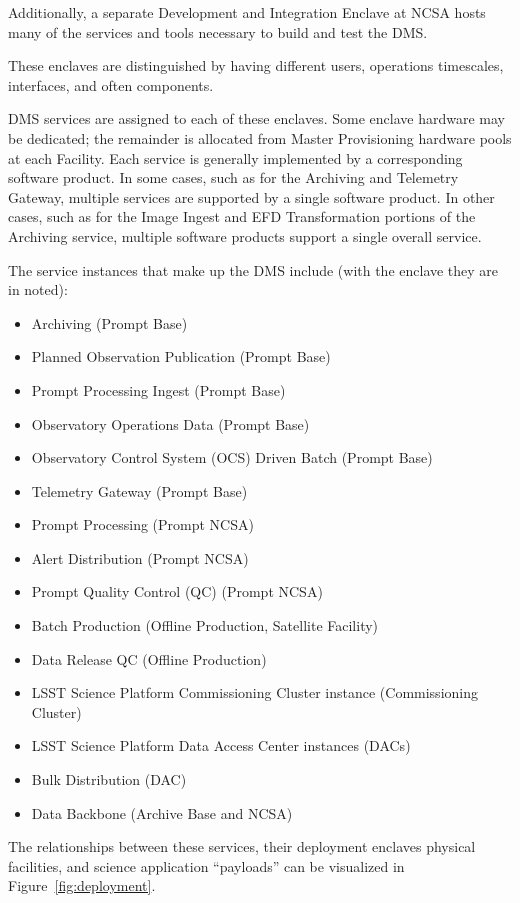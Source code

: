 \documentclass[DM,toc,lsstdraft]{lsstdoc}
\begin{document}
Additionally, a separate Development and Integration Enclave at NCSA hosts many of the services and tools necessary to build and test the DMS.

These enclaves are distinguished by having different users, operations timescales, interfaces, and often components.

DMS services are assigned to each of these enclaves.  Some enclave hardware may be dedicated; the remainder is allocated from Master Provisioning hardware pools at each Facility.
Each service is generally implemented by a corresponding software product.
In some cases, such as for the Archiving and Telemetry Gateway, multiple services are supported by a single software product.
In other cases, such as for the Image Ingest and EFD Transformation portions of the Archiving service, multiple software products support a single overall service.

The service instances that make up the DMS include (with the
enclave they are in noted):
\begin{itemize}
\item
  Archiving (Prompt Base)
\item
  Planned Observation Publication (Prompt Base)
\item
  Prompt Processing Ingest (Prompt Base)
\item
  Observatory Operations Data (Prompt Base)
\item
  Observatory Control System (OCS) Driven Batch (Prompt Base)
\item
  Telemetry Gateway (Prompt Base)
\item
  Prompt Processing (Prompt NCSA)
\item
  Alert Distribution (Prompt NCSA)
\item
  Prompt Quality Control (QC) (Prompt NCSA)
\item
  Batch Production (Offline Production, Satellite Facility)
\item
  Data Release QC (Offline Production)
\item
  LSST Science Platform Commissioning Cluster instance (Commissioning
  Cluster)
\item
  LSST Science Platform Data Access Center instances (DACs)
\item
  Bulk Distribution (DAC)
\item
  Data Backbone (Archive Base and NCSA)
\end{itemize}

The relationships between these services, their deployment enclaves
physical facilities, and science application ``payloads'' can be
visualized in Figure~\ref{fig:deployment}.
\end{document}
